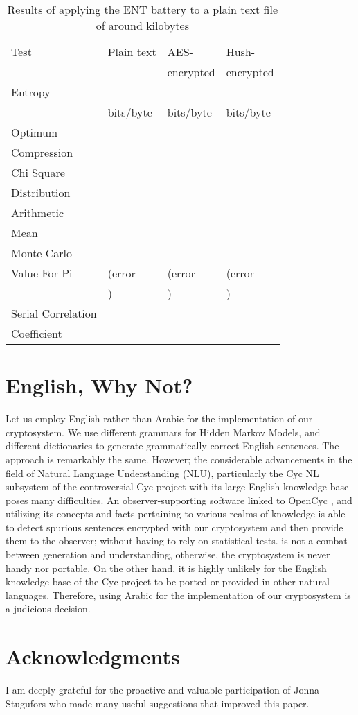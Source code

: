 \documentclass{acm_proc_article-sp}
\begin{document}
\begin{table}
    \centering
    \caption{Results of applying the ENT battery to a plain text file of around  kilobytes}
    \label{Results-of-applying}
    \begin{tabular}{llll}
    \toprule
    Test & Plain text & AES- & Hush- \\
    & & encrypted & encrypted \\
    \midrule
    Entropy &  &  &  \\
    & bits/byte & bits/byte & bits/byte \\

    Optimum &  &  &  \\
    Compression & & & \\

    Chi Square &  &  &  \\
    Distribution & & & \\

    Arithmetic &  &  &  \\
    Mean & & & \\

    Monte Carlo &  &  &  \\
    Value For Pi & (error & (error & (error \\
    & ) & ) & ) \\

    Serial Correlation &  &  &  \\
    Coefficient & & & \\
    \bottomrule
    \end{tabular}
\end{table}

\section{English, Why Not?}\label{English-Why-Not}
Let us employ English rather than Arabic for the implementation of our cryptosystem. We use different grammars for Hidden Markov Models, and different dictionaries to generate grammatically correct English sentences. The approach is remarkably the same. However; the considerable advancements in the field of Natural Language Understanding (NLU), particularly the Cyc NL subsystem \cite{Cycorpa} of the controversial Cyc project with its large English knowledge base poses many difficulties. An observer-supporting software linked to OpenCyc \cite{Cycorp}, and utilizing its concepts and facts pertaining to various realms of knowledge is able to detect spurious sentences encrypted with our cryptosystem and then provide them to the observer; without having to rely on statistical tests. \balancecolumns is not a combat between generation and understanding, otherwise, the cryptosystem is never handy nor portable. On the other hand, it is highly unlikely for the English knowledge base of the Cyc project to be ported or provided in other natural languages. Therefore, using Arabic for the implementation of our cryptosystem is a judicious decision.

\section{Acknowledgments}
I am deeply grateful for the proactive and valuable participation of Jonna Stugufors who made many useful suggestions that improved this paper.



\end{document}
